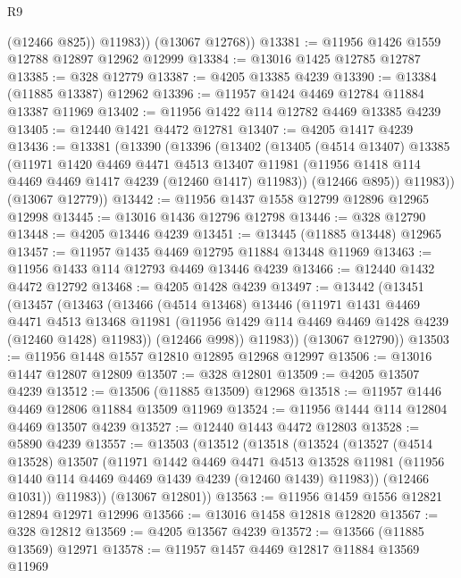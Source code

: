 \begin{lexlean}{R9}
\begin{coremodule}
            (@12466 @825))
          @11983))
      (@13067 @12768))
@13381 := @11956 @1426 @1559 @12788 @12897 @12962 @12999
@13384 := @13016 @1425 @12785 @12787
@13385 := @328 @12779
@13387 := @4205 @13385 @4239
@13390 := @13384 (@11885 @13387) @12962
@13396 := @11957 @1424 @4469 @12784 @11884 @13387 @11969
@13402 := @11956 @1422 @114 @12782 @4469 @13385 @4239
@13405 := @12440 @1421 @4472 @12781
@13407 := @4205 @1417 @4239
@13436 := @13381
    (@13390
      (@13396
        (@13402
          (@13405
            (@4514 @13407)
            @13385
            (@11971
              @1420
              @4469
              @4471
              @4513
              @13407
              @11981
              (@11956 @1418 @114 @4469 @4469 @1417 @4239 (@12460 @1417) @11983))
            (@12466 @895))
          @11983))
      (@13067 @12779))
@13442 := @11956 @1437 @1558 @12799 @12896 @12965 @12998
@13445 := @13016 @1436 @12796 @12798
@13446 := @328 @12790
@13448 := @4205 @13446 @4239
@13451 := @13445 (@11885 @13448) @12965
@13457 := @11957 @1435 @4469 @12795 @11884 @13448 @11969
@13463 := @11956 @1433 @114 @12793 @4469 @13446 @4239
@13466 := @12440 @1432 @4472 @12792
@13468 := @4205 @1428 @4239
@13497 := @13442
    (@13451
      (@13457
        (@13463
          (@13466
            (@4514 @13468)
            @13446
            (@11971
              @1431
              @4469
              @4471
              @4513
              @13468
              @11981
              (@11956 @1429 @114 @4469 @4469 @1428 @4239 (@12460 @1428) @11983))
            (@12466 @998))
          @11983))
      (@13067 @12790))
@13503 := @11956 @1448 @1557 @12810 @12895 @12968 @12997
@13506 := @13016 @1447 @12807 @12809
@13507 := @328 @12801
@13509 := @4205 @13507 @4239
@13512 := @13506 (@11885 @13509) @12968
@13518 := @11957 @1446 @4469 @12806 @11884 @13509 @11969
@13524 := @11956 @1444 @114 @12804 @4469 @13507 @4239
@13527 := @12440 @1443 @4472 @12803
@13528 := @5890 @4239
@13557 := @13503
    (@13512
      (@13518
        (@13524
          (@13527
            (@4514 @13528)
            @13507
            (@11971
              @1442
              @4469
              @4471
              @4513
              @13528
              @11981
              (@11956 @1440 @114 @4469 @4469 @1439 @4239 (@12460 @1439) @11983))
            (@12466 @1031))
          @11983))
      (@13067 @12801))
@13563 := @11956 @1459 @1556 @12821 @12894 @12971 @12996
@13566 := @13016 @1458 @12818 @12820
@13567 := @328 @12812
@13569 := @4205 @13567 @4239
@13572 := @13566 (@11885 @13569) @12971
@13578 := @11957 @1457 @4469 @12817 @11884 @13569 @11969

\end{coremodule}
\end{lexlean}

